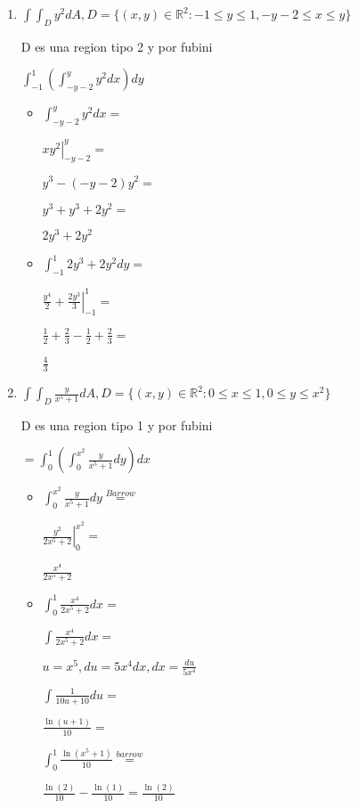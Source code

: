 \documentclass[../practica_08.tex]{subfiles}
\begin{document}
    \begin{enumerate}
        \item $\int \int_D y^2dA, D= \{(x,y) \in \mathbb{R}^2: -1 \leq y \leq 1, -y-2\leq x \leq y \} $
        
            D es una region tipo 2 y por fubini

            $\int_{-1}^1 (\int_{-y-2}^y y^2 dx ) dy$

            \begin{itemize}
                \item $ \int_{-y-2}^y y^2 dx = $
                
                    $ \left. xy^2 \right |_{-y-2}^y =$

                    $ y^3 - (-y-2)y^2 = $

                    $ y^3 + y^3 + 2y^2 = $

                    $ 2y^3 + 2y^2$

                \item $\int_{-1}^1 2y^3 + 2y^2 dy=$
                
                    $\left. \frac{y^4}{2} + \frac{2y^3}{3} \right |_{-1}^1 = $

                    $ \frac{1}{2} + \frac{2}{3} - \frac{1}{2} + \frac{2}{3} = $

                    $ \frac{4}{3} $

            \end{itemize}

            \item $\int \int_D \frac{y}{x^5+1} dA, D=\{(x,y) \in \mathbb{R}^2: 0\leq x \leq 1, 0\leq y \leq x^2\}$

                D es una region tipo 1 y por fubini

                $ = \int_0^1 (\int_0^{x^2} \frac{y}{x^5+1} dy) dx $

                \begin{itemize}
                    \item $\int_0^{x^2} \frac{y}{x^5+1} dy \stackrel{Barrow}{=} $
                    
                        $ \left. \frac{y^2}{2x^5+2} \right |_0^{x^2} =  $

                        $ \frac{x^4}{2x^5+2} $

                    \item $\int_0^1 \frac{x^4}{2x^5+2} dx =$
                    
                        $ \int \frac{x^4}{2x^5+2} dx = $

                        $ u = x^5, du = 5x^4 dx, dx = \frac{du}{5x^4} $

                        $ \int \frac{1}{10u+10} du = $

                        $ \frac{\ln(u+1)}{10} = $

                        $ \int_0^1 \frac{\ln(x^5+1)}{10} \stackrel{barrow}{=}$

                        $ \frac{\ln(2)}{10} - \frac{\ln(1)}{10} = \frac{\ln(2)}{10}$

                \end{itemize}

    \end{enumerate}
\end{document}
